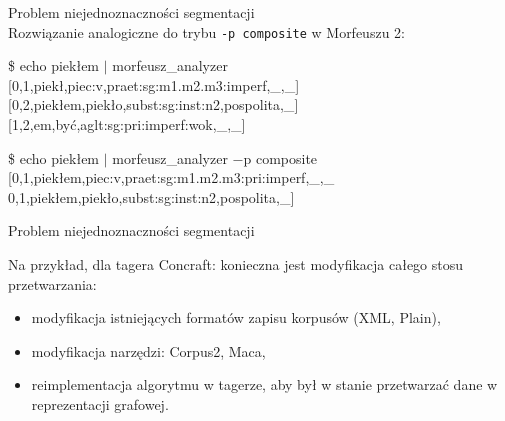 \documentclass[xcolor=dvipsnames,polish]{beamer}
\begin{document}
\begin{frame}{Problem niejednoznaczności segmentacji}
  \\
  Rozwiązanie analogiczne do trybu \texttt{-p composite} w Morfeuszu 2:
  \vspace{0.5cm}

  \$ echo piekłem $\vert$ morfeusz\_analyzer\\
  {[}0,1,piekł,piec:v,praet:sg:m1.m2.m3:imperf,\_,\_{]}\\
  {[}0,2,piekłem,piekło,subst:sg:inst:n2,pospolita,\_{]}\\
  {[}1,2,em,być,aglt:sg:pri:imperf:wok,\_,\_{]}\\
  \vspace{0.5cm}

  \$ echo piekłem $\vert$ morfeusz\_analyzer $-$p composite\\
  {[}0,1,piekłem,piec:v,praet:sg:m1.m2.m3:pri:imperf,\_,\_
  0,1,piekłem,piekło,subst:sg:inst:n2,pospolita,\_{]}
\end{frame}

\begin{frame}{Problem niejednoznaczności segmentacji}
  \vspace{0.5cm}

  Na przykład, dla tagera Concraft: konieczna jest modyfikacja całego stosu przetwarzania:
  \begin{itemize}
    \item modyfikacja istniejących formatów zapisu korpusów (XML, Plain),
    \item modyfikacja narzędzi: Corpus2, Maca,
    \item reimplementacja algorytmu w tagerze, aby był w stanie przetwarzać dane w reprezentacji grafowej.
  \end{itemize}
\end{frame}
\end{document}
